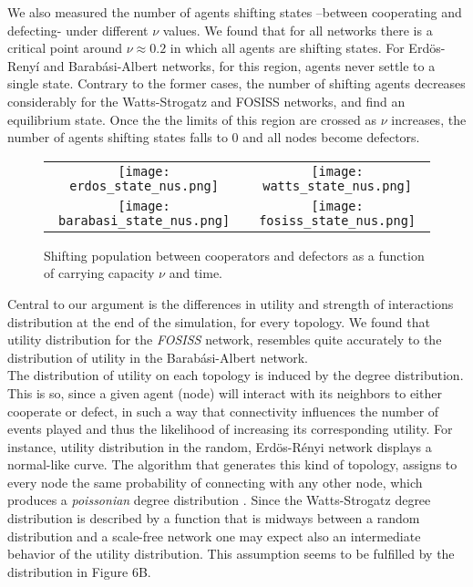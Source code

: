 \documentclass[11pt]{article}
\begin{document}
\FloatBarrier

We also measured the number of agents shifting states --between cooperating and
defecting- under different $\nu$ values. We found that for all networks there is
a critical point around  $\nu \approx 0.2$ in which all agents are shifting
states. For Erd\"{o}s-Reny\'i and Barab\'asi-Albert networks, for this region,
agents never settle to a single state. Contrary to the former cases, the number
of shifting agents decreases considerably for the Watts-Strogatz and FOSISS
networks, and find an equilibrium state. Once the the limits of this region are
crossed as $\nu$ increases, the number of agents shifting states falls to $0$
and all nodes become defectors. 


\begin{figure} [h!]
\centering
\begin{tabular}{cc}

\texttt{[image: erdos\_state\_nus.png]} & \texttt{[image: watts\_state\_nus.png]} \\
\texttt{[image: barabasi\_state\_nus.png]} & \texttt{[image: fosiss\_state\_nus.png]}
\end{tabular}
\caption{Shifting population between cooperators and defectors as a function of
  carrying capacity $\nu$ and time.}\label{state} 
\end{figure}

\FloatBarrier

Central to our argument is the differences in utility and strength of
interactions distribution at the end of the simulation, for every topology. We
found that utility distribution for the \textit{FOSISS} network, resembles quite
accurately to the distribution of utility in the Barab\'asi-Albert
network.\\ 


The distribution of utility on each topology is induced by the degree
distribution. This is so, since a given agent (node) will interact with its
neighbors to either cooperate or defect, in such a way that connectivity
influences the number of events played and thus the likelihood of increasing its
corresponding utility. For instance, utility distribution in the random,
Erd\"{o}s-R\'enyi network displays a normal-like curve. The algorithm that
generates this kind of topology, assigns to every node the same probability of
connecting with any other node, which produces a \textit{poissonian} degree
distribution \cite{Erdos1959}. Since the Watts-Strogatz degree distribution is
described by a function that is midways between a random distribution and a
scale-free network \cite{Barrat2000} one may expect also  an intermediate
behavior of the utility distribution. This assumption seems to be fulfilled by
the distribution in Figure 6B. 
\end{document}

